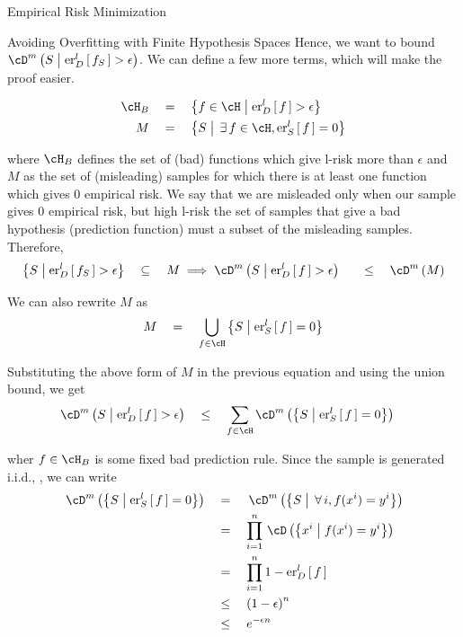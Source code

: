 \documentclass{article}
\begin{document}
\begin{ssection}{Empirical Risk Minimization}
\begin{ssubsection}{Avoiding Overfitting with Finite Hypothesis Spaces}
		Hence, we want to bound $\cD^m \para{S \pipe \err[_D^l]{f_S} > \epsilon}$. We can define a few more terms, which will make the proof easier.

		\begin{align*}
			\cH_B	&\eq	\set{f \in \cH \pipe \err[_D^l]{f} > \epsilon} \\
			M		&\eq	\set{S \pipe \qexists f \in \cH, \err[_S^l]{f} = 0}
		\end{align*} \sbr

		where $\cH_B$ defines the set of (bad) functions which give l-risk more than $\epsilon$ and $M$ as the set of (misleading) samples for which there is at least one function which gives 0 empirical risk. We say that we are misleaded only when our sample gives 0 empirical risk, but high l-risk  the set of samples that give a bad hypothesis (prediction function) must a subset of the misleading samples. Therefore,
		\begin{align*}
			\set{S \pipe \err[_D^l]{f_S} > \epsilon}				&\qsubseteq	M
			\implies \cD^m\para{S \pipe \err[_D^l]{f} > \epsilon}	&\qle		\cD^m\para{M}
		\end{align*} \sbr

		We can also rewrite $M$ as
		\begin{align*}
			M	\eq	\bigcup_{f \in \cH} \set{S \pipe \err[_S^l]{f} = 0}
		\end{align*} \sbr

		Substituting the above form of $M$ in the previous equation and using the union bound, we get
		\begin{align*}
			\cD^m\para{S \pipe \err[_D^l]{f} > \epsilon}	&\qle		\sum_{f \in \cH} \cD^m\para{\set{S \pipe \err[_S^l]{f} = 0}}
		\end{align*} \sbr

		wher $f \in \cH_B$ is some fixed bad prediction rule. Since the sample is generated i.i.d., , we can write
		\begin{align*}
			\func{\cD^m}{\set{S \pipe \err[_S^l]{f} = 0}}	&\eq	\func{\cD^m}{\set{S \pipe \qforall i, f(x^i) = y^i}} \\
															&\eq	\prod_{i = 1}^n \func{\cD}{\set{x^i \pipe f(x^i) = y^i}} \\
															&\eq	\prod_{i = 1}^n 1 - \err[_D^l]{f} \\
															&\qle	\para{1 - \epsilon}^n \\
															&\qle	\exp{-\epsilon n}
		\end{align*} \sbr


\end{ssubsection}
\end{ssection}
\end{document}
